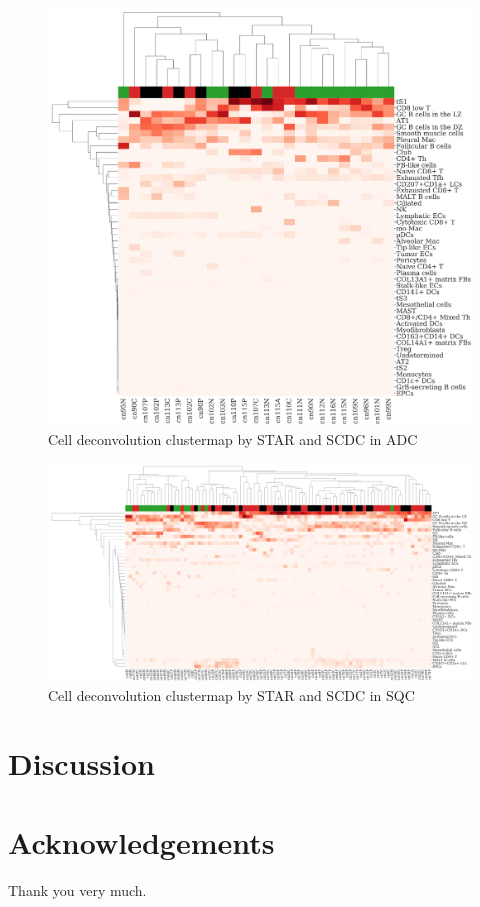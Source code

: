 \documentclass[11pt,a4paper,onecolumn,oneside]{report}
\begin{document}
                \begin{figure}[p]
                    \centering
                    \includegraphics[width=0.6 \linewidth]{figures/SCDC/clustermap/STAR.ADC.cluster.pdf}
                    \caption{Cell deconvolution clustermap by STAR and SCDC in ADC}
                    \label{fig:Deconvolution-SCDC-STAR-cluster-ADC}
                \end{figure}

                \begin{figure}[p]
                    \centering
                    \includegraphics[width=\linewidth]{figures/SCDC/clustermap/STAR.SQC.cluster.pdf}
                    \caption{Cell deconvolution clustermap by STAR and SCDC in SQC}
                    \label{fig:Deconvolution-SCDC-STAR-cluster-SQC}
                \end{figure}
    \newpage

    \section{Discussion}
    \newpage

    
    
    \newpage

    \section*{\hfill \Large Acknowledgements \hfill}
        Thank you very much.
    \newpage

    \hbox{}
    \thispagestyle{empty}
    \clearpage
\end{document}
